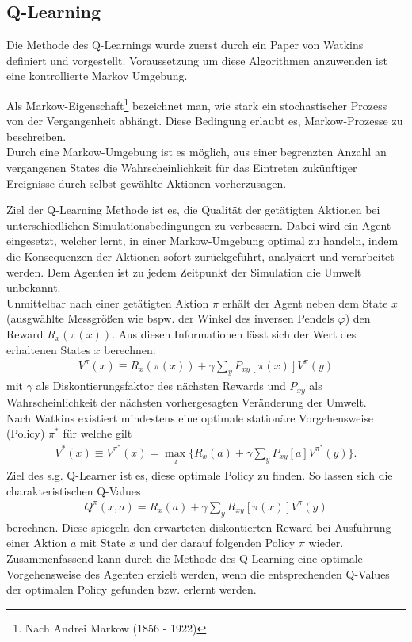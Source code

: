 	\subsection{Q-Learning}
		Die Methode des Q-Learnings wurde zuerst durch ein Paper von Watkins \cite{Watkins1992} definiert und vorgestellt. Voraussetzung um diese Algorithmen anzuwenden ist eine kontrollierte Markov Umgebung.
		\begin{remark}
			Als Markow-Eigenschaft\footnote{Nach Andrei Markow (1856 - 1922)} bezeichnet man, wie stark ein stochastischer Prozess von der Vergangenheit abhängt. Diese Bedingung erlaubt es, Markow-Prozesse zu beschreiben.\\
			Durch eine Markow-Umgebung ist es möglich, aus einer begrenzten Anzahl an vergangenen States die Wahrscheinlichkeit für das Eintreten zukünftiger Ereignisse durch selbst gewählte Aktionen vorherzusagen.
		\end{remark}
		Ziel der Q-Learning Methode ist es, die Qualität der getätigten Aktionen bei unterschiedlichen Simulationsbedingungen zu verbessern. Dabei wird ein Agent eingesetzt, welcher lernt, in einer Markow-Umgebung optimal zu handeln, indem die Konsequenzen der Aktionen sofort zurückgeführt, analysiert und verarbeitet werden. Dem Agenten ist zu jedem Zeitpunkt der Simulation die Umwelt unbekannt.\\
		Unmittelbar nach einer getätigten Aktion $\pi$ erhält der Agent neben dem State $x$ (ausgwählte Messgrößen wie bspw. der Winkel des inversen Pendels $\varphi$) den Reward $R_x(\pi(x))$. Aus diesen Informationen lässt sich der Wert des erhaltenen States $x$ berechnen:
		\begin{align}
			V^\pi(x) \equiv R_x(\pi(x)) + \gamma \sum_{y}P_{xy}[\pi(x)]V^\pi(y)
		\end{align}
		mit $\gamma$ als Diskontierungsfaktor des nächsten Rewards und $P_{xy}$ als Wahrscheinlichkeit der nächsten vorhergesagten Veränderung der Umwelt.\\
		Nach Watkins existiert mindestens eine optimale stationäre Vorgehensweise (\grqq Policy\glqq) $\pi^*$ für welche gilt
		\begin{align}
			V^*(x) \equiv V^{\pi^*}(x) = \max_{\substack{a}} \bigg\{R_x(a) + \gamma \sum_{y}P_{xy}[a]V^{\pi^*}(y)\bigg\}.
		\end{align}
		Ziel des s.g. \grqq Q-Learner \glqq{} ist es, diese optimale Policy zu finden. So lassen sich die charakteristischen Q-Values
		\begin{align}
			Q^\pi(x,a) = R_x(a) + \gamma \sum_{y}R_{xy}[\pi(x)]V^\pi(y)
		\end{align}
		berechnen. Diese spiegeln den erwarteten diskontierten Reward bei Ausführung einer Aktion $a$ mit State $x$ und der darauf folgenden Policy $\pi$ wieder. Zusammenfassend kann durch die Methode des Q-Learning eine optimale Vorgehensweise des Agenten erzielt werden, wenn die entsprechenden Q-Values der optimalen Policy gefunden bzw. erlernt werden.
